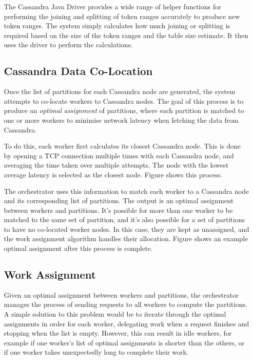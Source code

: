 
The Cassandra Java Driver provides a wide range of helper functions for performing the joining and splitting of token ranges accurately to produce new token ranges. The system simply calculates how much joining or splitting is required based on the size of the token ranges and the table size estimate. It then uses the driver to perform the calculations.

\subsection{Cassandra Data Co-Location}
Once the list of partitions for each Cassandra node are generated, the system attempts to co-locate workers to Cassandra nodes. The goal of this process is to produce an \textit{optimal assignment} of partitions, where each partition is matched to one or more workers to minimise network latency when fetching the data from Cassandra.

To do this, each worker first calculates its closest Cassandra node. This is done by opening a TCP connection multiple times with each Cassandra node, and averaging the time taken over multiple attempts. The node with the lowest average latency is selected as the closest node. Figure  shows this process.


The orchestrator uses this information to match each worker to a Cassandra node and its corresponding list of partitions. The output is an optimal assignment between workers and partitions. It's possible for more than one worker to be matched to the same set of partition, and it's also possible for a set of partitions to have no co-located worker nodes. In this case, they are kept as unassigned, and the work assignment algorithm handles their allocation. Figure  shows an example optimal assignment after this process is complete.


\subsection{Work Assignment}
Given an optimal assignment between workers and partitions, the orchestrator manages the process of sending requests to all workers to compute the partitions. A simple solution to this problem would be to iterate through the optimal assignments in order for each worker, delegating work when a request finishes and stopping when the list is empty. However, this can result in idle workers, for example if one worker's list of optimal assignments is shorter than the others, or if one worker takes unexpectedly long to complete their work.

